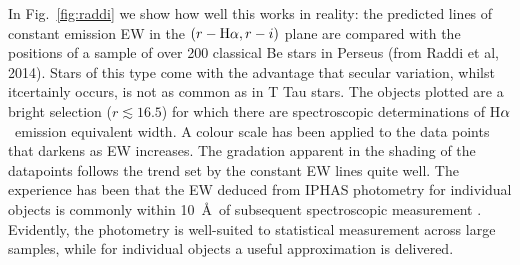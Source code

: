 \documentclass[a4paper,useAMS,usenatbib]{mn2e}
\def\ha{\mbox{H$\rm \alpha$}}
\begin{document}
{In Fig.~\ref{fig:raddi} we show how well this works in reality:
the predicted lines of constant emission EW
in the $(r - \ha, r - i)$ plane
are compared with the positions of a sample
of over 200 classical Be stars in Perseus (from Raddi et al, 2014).
Stars of this type come with the advantage that secular variation,
whilst itcertainly occurs,
is not as common as in T Tau stars.
The objects plotted are a bright selection ($r \lesssim 16.5$)
for which there are spectroscopic determinations
of \ha\ emission equivalent width.
A colour scale has been applied to the data points
that darkens as EW increases.
The gradation apparent in the shading of the datapoints
follows the trend set by the constant EW lines quite well.  
The experience has been that the EW deduced from
IPHAS photometry for individual objects is commonly within 10~\AA\
of subsequent spectroscopic measurement
\citep[see also fig.~5 of][]{Barentsen2011a}.
Evidently, the photometry is well-suited to statistical measurement
across large samples, while for individual objects a useful
approximation is delivered.

}
\end{document}
